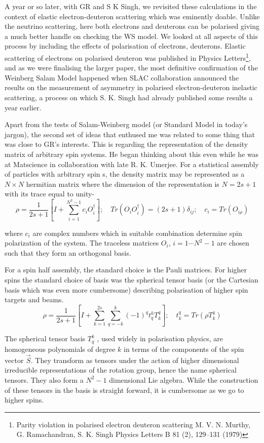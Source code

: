 A year or so later, with GR and S K Singh, we revisited these calculations in the context of elastic electron-deuteron scattering which was eminently doable. Unlike the neutrino scattering, here both electrons and deuterons can be polarised giving a much better handle on checking the WS model. We looked at all aspects of this process by including the effects of polarisation of electrons, deuterons. Elastic scattering of electrons on polarised deuteron was published in Physics Letters\footnote{Parity violation in polarised electron deuteron scattering M. V. N. Murthy, G. Ramachandran, S. K. Singh Physics Letters B 81 (2), 129--131 (1979)}, and as we were finalising the larger paper, the most definitive confirmation of the Weinberg Salam Model happened when SLAC collaboration announced the results on the measurement of asymmetry in polarised electron-deuteron inelastic scattering, a process on which S. K. Singh had already published some results a year earlier.

Apart from the tests of Salam-Weinberg model (or Standard Model in today’s jargon), the second set of ideas that enthused me was related to some thing that was close to GR’s interests. This is regarding the representation of the density matrix of arbitrary spin systems. He began thinking about this even while he was at Matscience in collaboration with late R. K. Umerjee. For a statistical assembly of particles with arbitrary spin s, the density matrix may be represented as a $N \times N$ hermitian matrix where the dimension of the representation is $N = 2s + 1$ with its trace equal to unity-
$$
\rho =\dfrac{1}{2s+1}\left[I + \sum\limits_{i=1}^{N^{2}-1} c_{i}O_{i}^{\dagger}\right];\quad Tr(O_{i}O_{i}^{\dagger}) = (2s +1)\delta_{ij}; \quad c_{i}=Tr(O_{i\rho})
$$

\noindent
where $c_{i}$ are complex numbers which in suitable combination determine spin polarization of the system. The traceless matrices $O_{i}$, $i = 1 \cdots$\break $N^{2}-1$ are chosen such that they form an orthogonal basis.

For a spin half assembly, the standard choice is the Pauli matrices. For higher spins the standard choice of basis was the spherical tensor basis (or the Cartesian basis which was even more cumbersome) describing polarisation of higher spin targets and beams.
$$
\rho= \dfrac{1}{2s+1}\left[I + \sum\limits_{k=1}^{2s}\sum\limits_{q=-k}^{k}(-1)^{q}t_{q}^{k}T_{k}^{q}\right]; \quad t_{k}^{q}= Tr(\rho T_{k}^{q})
$$

The spherical tensor basis $T_{q}^{k}$ , used widely in polarisation physics, are homogeneous polynomials of degree $k$ in terms of the components of the spin vector $\vec{S}$. They transform as tensors under the action of higher dimensional irreducible representations of the rotation group, hence the name spherical tensors. They also form a $N^{2}-1$ dimensional Lie algebra. While the construction of these tensors in the basis is straight forward, it is cumbersome as we go to higher spins.


